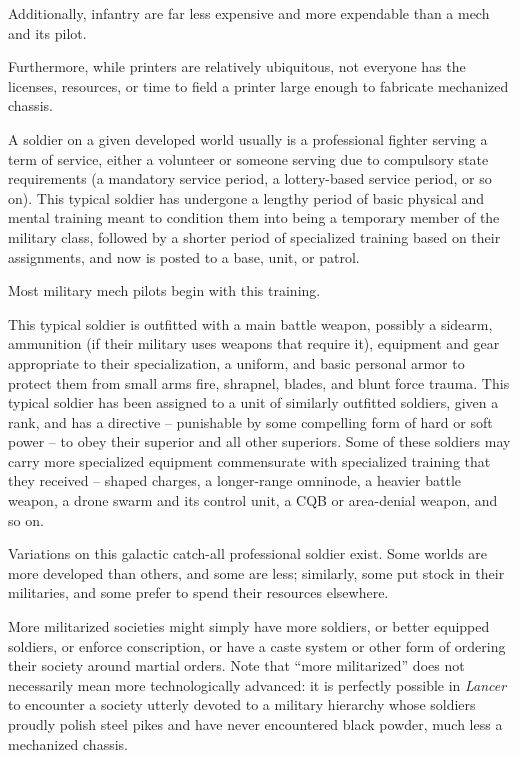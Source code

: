 Additionally, infantry are far less expensive and more expendable than a mech and its pilot.

Furthermore, while printers are relatively ubiquitous, not everyone has the licenses, resources, or
time to field a printer large enough to fabricate mechanized chassis.

A soldier on a given developed world usually is a professional fighter serving a term of service,
either a volunteer or someone serving due to compulsory state requirements (a mandatory
service period, a lottery-based service period, or so on). This typical soldier has undergone a
lengthy period of basic physical and mental training meant to condition them into being a
temporary member of the military class, followed by a shorter period of specialized training
based on their assignments, and now is posted to a base, unit, or patrol.

Most military mech pilots begin with this training.

This typical soldier is outfitted with a main battle weapon, possibly a sidearm, ammunition (if their
military uses weapons that require it), equipment and gear appropriate to their specialization, a
uniform, and basic personal armor to protect them from small arms fire, shrapnel, blades, and
blunt force trauma. This typical soldier has been assigned to a unit of similarly outfitted soldiers,
given a rank, and has a directive -- punishable by some compelling form of hard or soft power --
to obey their superior and all other superiors. Some of these soldiers may carry more specialized
equipment commensurate with specialized training that they received -- shaped charges, a
longer-range omninode, a heavier battle weapon, a drone swarm and its control unit, a CQB or
area-denial weapon, and so on.

Variations on this galactic catch-all professional soldier exist. Some worlds are more developed
than others, and some are less; similarly, some put stock in their militaries, and some prefer to
spend their resources elsewhere.

More militarized societies might simply have more soldiers, or better equipped soldiers, or
enforce conscription, or have a caste system or other form of ordering their society around
martial orders. Note that ``more militarized'' does not necessarily mean more technologically
advanced: it is perfectly possible in \textit{Lancer} to encounter a society utterly devoted to a military
hierarchy whose soldiers proudly polish steel pikes and have never encountered black powder,
much less a mechanized chassis.

